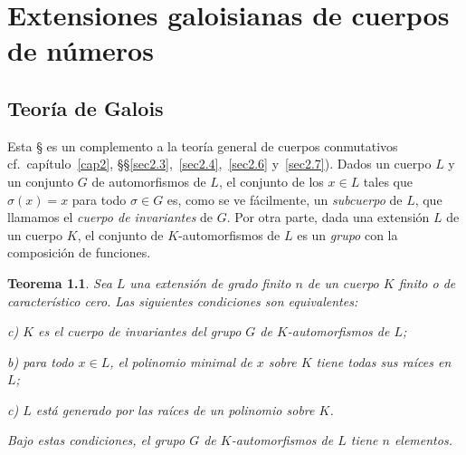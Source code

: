 \documentclass[10pt,oneside,bibtotoc,smallheadings,leqno,a5paper,DIV=12]{scrbook}
\numberwithin{equation}{section}
\theoremstyle{defi}
\theoremstyle{enonce}
\newtheorem{theorem}{Teorema}
\theoremstyle{rem}
\numberwithin{theorem}{section}
\numberwithin{proposition}{section}
\numberwithin{definition}{section}
\numberwithin{lemma}{section}
\numberwithin{corollary}{section}
\numberwithin{example}{section}
\numberwithin{footnote}{section}%
\begin{document}
\chapter{Extensiones galoisianas de cuerpos de n\'umeros}

\section{Teor\'ia de Galois}\label{sec6.1}

Esta {\S} es un complemento a la teor\'ia general de cuerpos conmutativos
cf.~cap\'itulo~\ref{cap2}, \S\S\ref{sec2.3},~\ref{sec2.4},~\ref{sec2.6} y~\ref{sec2.7}).
Dados un cuerpo $L$ y un conjunto $G$ de automorfismos de $L$, el conjunto de los $x\in L$ tales que
$\sigma(x) = x$ para todo $\sigma\in G$ es, como se ve f\'acilmente, un {\em subcuerpo} de $L$, que llamamos
el {\em cuerpo de invariantes} de $G$. Por otra parte, dada una extensi\'on $L$ de un cuerpo $K$, el conjunto
de $K$-automorfismos de $L$ es un {\em grupo} con la composici\'on de funciones.

\begin{theorem}\label{teo6.1.1}
Sea $L$ una extensi\'on de grado finito $n$ de un cuerpo $K$ finito o de caracter\'istico cero. Las siguientes
condiciones son equivalentes:
\begin{trivlist}\setlength{\itemindent}{\parindent}
\item c) $K$ es el cuerpo de invariantes del grupo $G$ de $K$-automorfismos de $L$;
\item b) para todo $x\in L$, el polinomio minimal de $x$ sobre $K$ tiene todas sus ra\'ices en $L$;
\item c) $L$ est\'a generado por las ra\'ices de un polinomio sobre $K$.
\end{trivlist}
Bajo estas condiciones, el grupo $G$ de $K$-automorfismos de $L$ tiene $n$ elementos.
\end{theorem}
\end{document}
